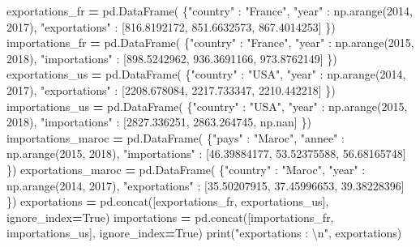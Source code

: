 \documentclass[12pt,]{book}
\newenvironment{Shaded}{\begin{snugshade}}{\end{snugshade}}
\newcommand{\DecValTok}[1]{\textcolor[rgb]{0.00,0.00,0.81}{#1}}
\newcommand{\FloatTok}[1]{\textcolor[rgb]{0.00,0.00,0.81}{#1}}
\newcommand{\CharTok}[1]{\textcolor[rgb]{0.31,0.60,0.02}{#1}}
\newcommand{\StringTok}[1]{\textcolor[rgb]{0.31,0.60,0.02}{#1}}
\newcommand{\VariableTok}[1]{\textcolor[rgb]{0.00,0.00,0.00}{#1}}
\newcommand{\OperatorTok}[1]{\textcolor[rgb]{0.81,0.36,0.00}{\textbf{#1}}}
\newcommand{\BuiltInTok}[1]{#1}
\newcommand{\NormalTok}[1]{#1}
\numberwithin{equation}{section}
\numberwithin{countremarque}{section}
\begin{document}
\begin{Shaded}
\begin{Highlighting}[]
\NormalTok{exportations_fr }\OperatorTok{=}\NormalTok{ pd.DataFrame(}
\NormalTok{    \{}\StringTok{"country"}\NormalTok{ : }\StringTok{"France"}\NormalTok{,}
     \StringTok{"year"}\NormalTok{ : np.arange(}\DecValTok{2014}\NormalTok{, }\DecValTok{2017}\NormalTok{),}
     \StringTok{"exportations"}\NormalTok{ : [}\FloatTok{816.8192172}\NormalTok{, }\FloatTok{851.6632573}\NormalTok{, }\FloatTok{867.4014253}\NormalTok{]}
\NormalTok{    \})}
\NormalTok{importations_fr }\OperatorTok{=}\NormalTok{ pd.DataFrame(}
\NormalTok{    \{}\StringTok{"country"}\NormalTok{ : }\StringTok{"France"}\NormalTok{,}
     \StringTok{"year"}\NormalTok{ : np.arange(}\DecValTok{2015}\NormalTok{, }\DecValTok{2018}\NormalTok{),}
     \StringTok{"importations"}\NormalTok{ : [}\FloatTok{898.5242962}\NormalTok{, }\FloatTok{936.3691166}\NormalTok{, }\FloatTok{973.8762149}\NormalTok{]}
\NormalTok{    \})}
\NormalTok{exportations_us }\OperatorTok{=}\NormalTok{ pd.DataFrame(}
\NormalTok{    \{}\StringTok{"country"}\NormalTok{ : }\StringTok{"USA"}\NormalTok{,}
     \StringTok{"year"}\NormalTok{ : np.arange(}\DecValTok{2014}\NormalTok{, }\DecValTok{2017}\NormalTok{),}
     \StringTok{"exportations"}\NormalTok{ : [}\FloatTok{2208.678084}\NormalTok{, }\FloatTok{2217.733347}\NormalTok{, }\FloatTok{2210.442218}\NormalTok{]}
\NormalTok{    \})}
\NormalTok{importations_us }\OperatorTok{=}\NormalTok{ pd.DataFrame(}
\NormalTok{    \{}\StringTok{"country"}\NormalTok{ : }\StringTok{"USA"}\NormalTok{,}
     \StringTok{"year"}\NormalTok{ : np.arange(}\DecValTok{2015}\NormalTok{, }\DecValTok{2018}\NormalTok{),}
     \StringTok{"importations"}\NormalTok{ : [}\FloatTok{2827.336251}\NormalTok{, }\FloatTok{2863.264745}\NormalTok{, np.nan]}
\NormalTok{    \})}
\NormalTok{importations_maroc }\OperatorTok{=}\NormalTok{ pd.DataFrame(}
\NormalTok{    \{}\StringTok{"pays"}\NormalTok{ : }\StringTok{"Maroc"}\NormalTok{,}
     \StringTok{"annee"}\NormalTok{ : np.arange(}\DecValTok{2015}\NormalTok{, }\DecValTok{2018}\NormalTok{),}
     \StringTok{"importations"}\NormalTok{ : [}\FloatTok{46.39884177}\NormalTok{, }\FloatTok{53.52375588}\NormalTok{, }\FloatTok{56.68165748}\NormalTok{]}
\NormalTok{    \})}
\NormalTok{exportations_maroc }\OperatorTok{=}\NormalTok{ pd.DataFrame(}
\NormalTok{    \{}\StringTok{"country"}\NormalTok{ : }\StringTok{"Maroc"}\NormalTok{,}
     \StringTok{"year"}\NormalTok{ : np.arange(}\DecValTok{2014}\NormalTok{, }\DecValTok{2017}\NormalTok{),}
     \StringTok{"exportations"}\NormalTok{ : [}\FloatTok{35.50207915}\NormalTok{, }\FloatTok{37.45996653}\NormalTok{, }\FloatTok{39.38228396}\NormalTok{]}
\NormalTok{    \})}
\NormalTok{exportations }\OperatorTok{=}\NormalTok{ pd.concat([exportations_fr, exportations_us], ignore_index}\OperatorTok{=}\VariableTok{True}\NormalTok{)}
\NormalTok{importations }\OperatorTok{=}\NormalTok{ pd.concat([importations_fr, importations_us], ignore_index}\OperatorTok{=}\VariableTok{True}\NormalTok{)}
\BuiltInTok{print}\NormalTok{(}\StringTok{"exportations : }\CharTok{\textbackslash{}n}\StringTok{"}\NormalTok{, exportations)}
\end{Highlighting}
\end{Shaded}
\end{document}

